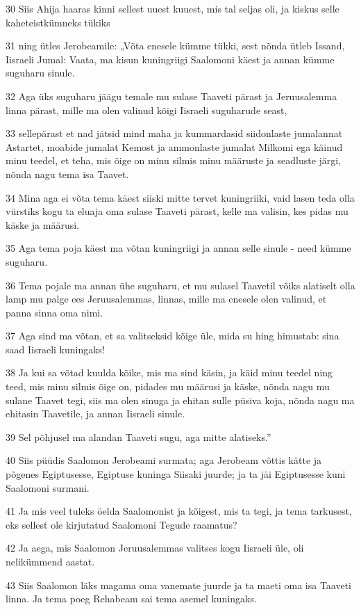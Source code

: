 \par 30 Siis Ahija haaras kinni sellest uuest kuuest, mis tal seljas oli, ja kiskus selle kaheteistkümneks tükiks
\par 31 ning ütles Jerobeamile: „Võta enesele kümme tükki, sest nõnda ütleb Issand, Iisraeli Jumal: Vaata, ma kisun kuningriigi Saalomoni käest ja annan kümme suguharu sinule.
\par 32 Aga üks suguharu jäägu temale mu sulase Taaveti pärast ja Jeruusalemma linna pärast, mille ma olen valinud kõigi Iisraeli suguharude seast,
\par 33 sellepärast et nad jätsid mind maha ja kummardasid siidonlaste jumalannat Astartet, moabide jumalat Kemost ja ammonlaste jumalat Milkomi ega käinud minu teedel, et teha, mis õige on minu silmis minu määruste ja seadluste järgi, nõnda nagu tema isa Taavet.
\par 34 Mina aga ei võta tema käest siiski mitte tervet kuningriiki, vaid lasen teda olla vürstiks kogu ta eluaja oma sulase Taaveti pärast, kelle ma valisin, kes pidas mu käske ja määrusi.
\par 35 Aga tema poja käest ma võtan kuningriigi ja annan selle sinule - need kümme suguharu.
\par 36 Tema pojale ma annan ühe suguharu, et mu sulasel Taavetil võiks alatiselt olla lamp mu palge ees Jeruusalemmas, linnas, mille ma enesele olen valinud, et panna sinna oma nimi.
\par 37 Aga sind ma võtan, et sa valitseksid kõige üle, mida su hing himustab: sina saad Iisraeli kuningaks!
\par 38 Ja kui sa võtad kuulda kõike, mis ma sind käsin, ja käid minu teedel ning teed, mis minu silmis õige on, pidades mu määrusi ja käske, nõnda nagu mu sulane Taavet tegi, siis ma olen sinuga ja ehitan sulle püsiva koja, nõnda nagu ma ehitasin Taavetile, ja annan Iisraeli sinule.
\par 39 Sel põhjusel ma alandan Taaveti sugu, aga mitte alatiseks.”
\par 40 Siis püüdis Saalomon Jerobeami surmata; aga Jerobeam võttis kätte ja põgenes Egiptusesse, Egiptuse kuninga Siisaki juurde; ja ta jäi Egiptusesse kuni Saalomoni surmani.
\par 41 Ja mis veel tuleks öelda Saalomonist ja kõigest, mis ta tegi, ja tema tarkusest, eks sellest ole kirjutatud Saalomoni Tegude raamatus?
\par 42 Ja aega, mis Saalomon Jeruusalemmas valitses kogu Iisraeli üle, oli nelikümmend aastat.
\par 43 Siis Saalomon läks magama oma vanemate juurde ja ta maeti oma isa Taaveti linna. Ja tema poeg Rehabeam sai tema asemel kuningaks.

